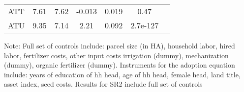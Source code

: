\begin{table}[htbp]
\begin{threeparttable}
\begin{tabular}{l cccccc}
ATT         &        7.61&        7.62&      -0.013&       0.019&        0.47\\
%
%
%
ATU         &        9.35&        7.14&        2.21&       0.092&    2.7e-127\\
\hline
\hline
\end{tabular}
\begin{tablenotes}
\footnotesize
\item{Note: Full set of controls include: parcel size (in HA), household labor, hired labor, fertilizer costs, other input costs irrigation (dummy), mechanization (dummy), organic fertilizer (dummy). Instruments for the adoption equation include: years of education of hh head, age of hh head, female head, land title, asset index, seed costs. Results for SR2 include full set of controls}
\end{tablenotes}
\end{threeparttable}
\end{table}
